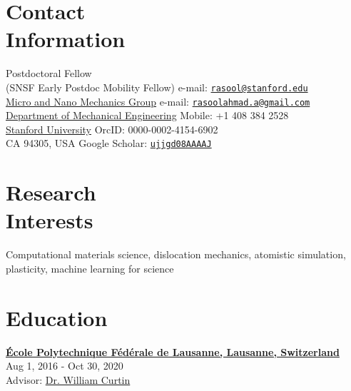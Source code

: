 \documentclass[margin,line]{resume}
\begin{document}
\renewcommand{\thefootnote}{\fnsymbol{footnote}}
\begin{resume}

    \section{\mysidestyle Contact\\Information}
    Postdoctoral Fellow \\
    (SNSF Early Postdoc Mobility Fellow) \hfill e-mail: {\href{mailto:rasool@stanford.edu}{\nolinkurl{rasool@stanford.edu}}} \\
    \href{https://micronano.stanford.edu/}{Micro and Nano Mechanics Group} \hfill e-mail: {\href{mailto:rasoolahmad.a@gmail.com}{\nolinkurl{rasoolahmad.a@gmail.com}}} \\
    \href{https://me.stanford.edu/}{Department of Mechanical Engineering} \hfill Mobile: +1 408 384 2528 \\
    \href{https://www.stanford.edu/}{Stanford University} \hfill OrcID:  0000-0002-4154-6902 \\
    CA 94305, USA  \hfill Google Scholar: {\href{https://scholar.google.ch/citations?user=ujjgd08AAAAJ&hl=en}{\nolinkurl{ujjgd08AAAAJ}}}




    \section{\mysidestyle Research\\Interests}

    Computational materials science, dislocation mechanics, atomistic simulation, plasticity, machine learning for science

    \section{\mysidestyle Education}

    \textbf{\href{https://www.epfl.ch/en/}{\textsf{\'Ecole Polytechnique F\'ed\'erale de Lausanne, Lausanne,
                Switzerland} }} \\
     \hfill \small{Aug 1, 2016 - Oct 30, 2020} \\
    Advisor:  \href{https://people.epfl.ch//william.curtin?lang=en}{Dr. William Curtin}


\end{resume}
\end{document}
